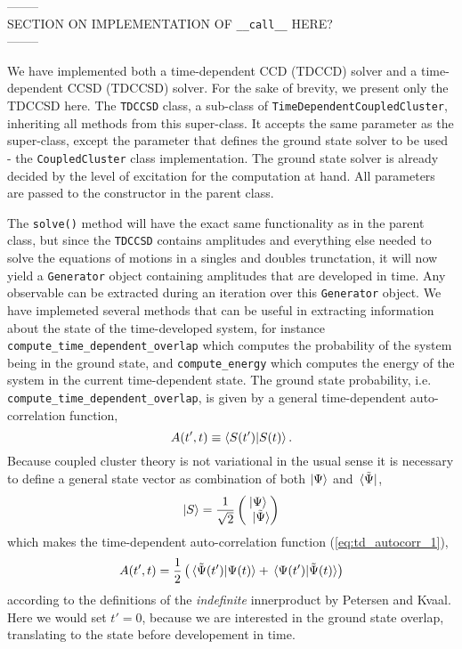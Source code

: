     \noindent -------- \\
    SECTION ON IMPLEMENTATION OF \lstinline{__call__} HERE? \\
    \noindent -------- 

    We have implemented both a time-dependent CCD (TDCCD) solver and a time-dependent CCSD
    (TDCCSD)
    solver. For the sake of brevity, we present only the TDCCSD here. 
    The \lstinline{TDCCSD} class, a sub-class of \lstinline{TimeDependentCoupledCluster},
    inheriting all methods from this super-class. It accepts the same parameter as the super-class, except the 
    parameter that defines the ground state solver to be used - the \lstinline{CoupledCluster}
    class implementation. The ground state solver is already decided by the level of 
    excitation for the computation at hand. All parameters are passed to the constructor 
    in the parent class.

    The \lstinline{solve()} method will have the exact same functionality as in the parent class,
    but since the \lstinline{TDCCSD} contains amplitudes and everything else needed to 
    solve the equations of motions in a singles and doubles trunctation, it will now yield a 
    \lstinline{Generator} object 
    containing amplitudes that are developed in time. Any observable can be extracted during 
    an iteration over this \lstinline{Generator} object. We have implemeted several methods that 
    can be useful in extracting information about the state of the time-developed system,
    for instance \lstinline{compute_time_dependent_overlap} which computes the 
    probability of the system being in the ground state, and \lstinline{compute_energy} 
    which computes the energy of the system in the current time-dependent state.
    The ground state probability, i.e. \lstinline{compute_time_dependent_overlap}, is 
    given by a general time-dependent auto-correlation function,
    \begin{equation}
        \label{eq:td_autocorr_1}
        A(t', t) \equiv \braket{S(t')}{S(t)}.
    \end{equation}
    Because coupled cluster theory is not variational in the usual sense it is necessary to 
    define a general state vector as combination of both $\ket{\Psi}$ and $\bra*{\tilde{\Psi}}$,
    \begin{equation}
        \ket{S} = \frac{1}{\sqrt{2}} \begin{pmatrix}
            \ket{\Psi} \\ \ket*{\tilde{\Psi}}
        \end{pmatrix}
    \end{equation}
    which makes the time-dependent auto-correlation function (\autoref{eq:td_autocorr_1}),
    \begin{equation}
        A(t', t) = \frac{1}{2} 
        \left( \braket*{\tilde{\Psi}(t')}{\Psi(t)} 
            +  \braket*{\Psi(t')}{\tilde{\Psi}(t)}  \right)
    \end{equation}
    according to the definitions of the \emph{indefinite} innerproduct by Petersen and 
    Kvaal\cite{pedersen2019symplectic}. Here we would set $t'=0$, because we are
    interested in the ground state overlap, translating to the state before developement 
    in time.

